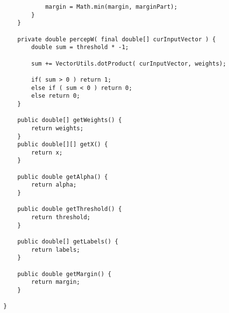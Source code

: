 \begin{lstlisting}
			margin = Math.min(margin, marginPart);
		}
	}
	
	private double percepW( final double[] curInputVector ) {
		double sum = threshold * -1;
		
		sum += VectorUtils.dotProduct( curInputVector, weights);
		
		if( sum > 0 ) return 1;
		else if ( sum < 0 ) return 0;
		else return 0;
	}

	public double[] getWeights() {
		return weights;
	}
	public double[][] getX() {
		return x;
	}

	public double getAlpha() {
		return alpha;
	}

	public double getThreshold() {
		return threshold;
	}

	public double[] getLabels() {
		return labels;
	}

	public double getMargin() {
		return margin;
	}

}
\end{lstlisting}


